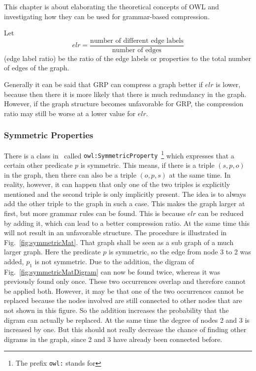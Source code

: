 This chapter is about elaborating the theoretical concepts of OWL and investigating how they can be used for grammar-based compression.

Let \[ elr = \dfrac{\text{number of different edge labels}}{\text{number of edges}} \] (edge label ratio) be the ratio of the edge labels or properties to the total number of edges of the graph. 

Generally it can be said that GRP can compress a graph better if $elr$ is lower, because then there it is more likely that there is much redundancy in the graph. However, if the graph structure becomes unfavorable for GRP, the compression ratio may still be worse at a lower value for $elr$.


\subsubsection{Symmetric Properties}


There is a class in~\cite{owl} called {\tt owl:SymmetricProperty}~\footnote{The prefix {\tt owl:} stands for} which expresses that a certain other predicate $p$ is symmetric. This means, if there is a triple $(s,p,o)$ in the graph, then there can also be a triple $(o,p,s)$ at the same time. In reality, however, it can happen that only one of the two triples is explicitly mentioned and the second triple is only implicitly present. The idea is to always add the other triple to the graph in such a case. This makes the graph larger at first, but more grammar rules can be found. This is because $elr$ can be reduced by adding it, which can lead to a better compression ratio. At the same time this will not result in an unfavorable structure. The procedure is illustrated in Fig.~\ref{fig:symmetricMat}. That graph shall be seen as a sub graph of a much larger graph. Here the predicate $p$ is symmetric, so the edge from node 3 to 2 was added, $p_1$ is not symmetric. Due to the addition, the digram of Fig.~\ref{fig:symmetricMatDigram} can now be found twice, whereas it was previously found only once. These two occurrences overlap and therefore cannot be applied both. However, it may be that one of the two occurrences cannot be replaced because the nodes involved are still connected to other nodes that are not shown in this figure. So the addition increases the probability that the digram can actually be replaced. At the same time the degree of nodes 2 and 3 is increased by one. But this should not really decrease the chance of finding other digrams in the graph, since 2 and 3 have already been connected before.


